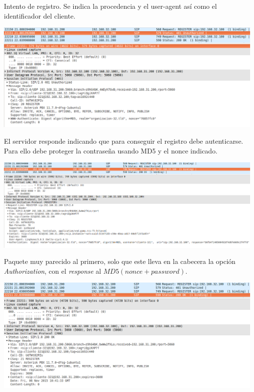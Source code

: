 \documentclass[]{article}
\begin{document}
Intento de registro. Se indica la procedencia y el user-agent así como el identificador del cliente.

\begin{center}
	\includegraphics[width=1\linewidth]{images/voip2}
\end{center}

El servidor responde indicando que para conseguir el registro debe autenticarse. Para ello debe proteger la contraseña usando MD5 y el nonce indicado.

\begin{center}
	\includegraphics[width=1\linewidth]{images/voip3}
\end{center}

Paquete muy parecido al primero, solo que este lleva en la cabecera la opción \textit{Authorization}, con el \textit{response} al $MD5(nonce+password)$.

\begin{center}
	\includegraphics[width=1\linewidth]{images/voip4}
\end{center}
\end{document}
